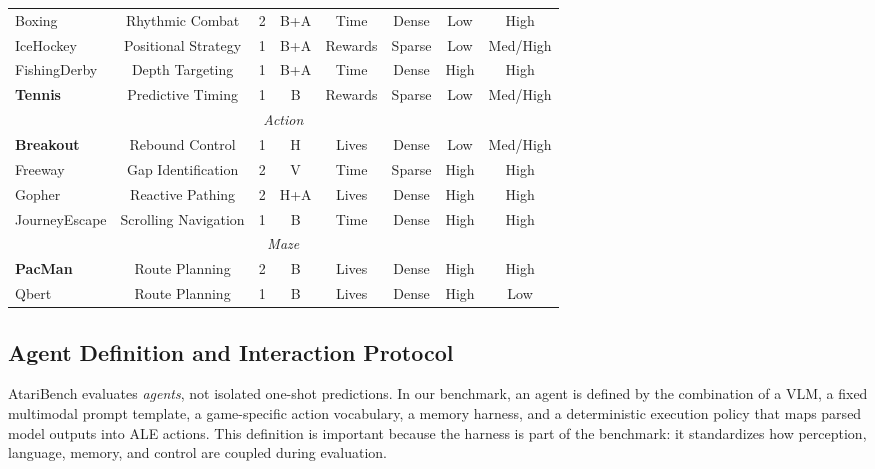 \begin{table}[ht]
\begin{tabular}{lccccccc}
\midrule
Boxing                 & Rhythmic Combat             & 2 & B{+}A & Time    & Dense  & Low  & High \\
IceHockey              & Positional Strategy         & 1 & B{+}A & Rewards & Sparse & Low  & Med/High \\
FishingDerby           & Depth Targeting             & 1 & B{+}A & Time    & Dense  & High & High \\
\textbf{Tennis}        & Predictive Timing           & 1 & B     & Rewards & Sparse & Low  & Med/High \\
\midrule
\multicolumn{8}{c}{\it Action} \\
\midrule
\textbf{Breakout}      & Rebound Control             & 1 & H     & Lives   & Dense  & Low  & Med/High \\
Freeway                & Gap Identification          & 2 & V     & Time    & Sparse & High & High \\
Gopher                 & Reactive Pathing            & 2 & H{+}A & Lives   & Dense  & High & High \\
JourneyEscape          & Scrolling Navigation        & 1 & B     & Time    & Dense  & High & High \\
\midrule
\multicolumn{8}{c}{\it Maze} \\
\midrule
\textbf{PacMan}        & Route Planning              & 2 & B     & Lives   & Dense  & High & High \\
Qbert                  & Route Planning              & 1 & B     & Lives   & Dense  & High & Low  \\
\bottomrule
\end{tabular}
\end{table}

\subsection{Agent Definition and Interaction Protocol}

AtariBench evaluates \emph{agents}, not isolated one-shot predictions. In our benchmark, an agent is defined by the combination of a VLM, a fixed multimodal prompt template, a game-specific action vocabulary, a memory harness, and a deterministic execution policy that maps parsed model outputs into ALE actions. This definition is important because the harness is part of the benchmark: it standardizes how perception, language, memory, and control are coupled during evaluation.

